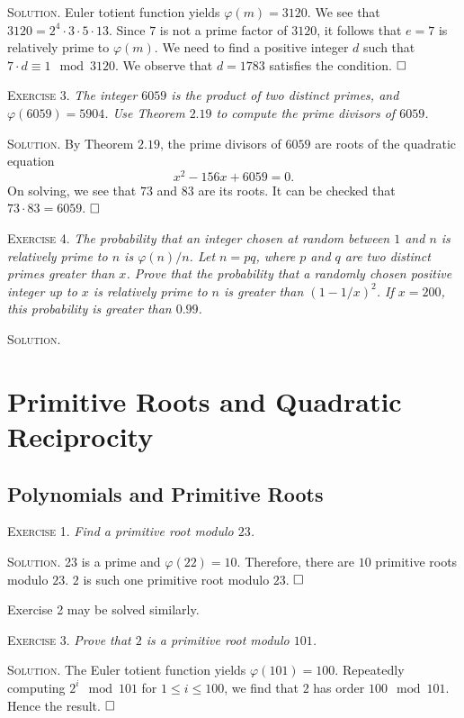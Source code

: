 \documentclass[11pt, leqno]{article}
\newcommand{\done}{\ensuremath{\hfill\square}}
\begin{document}
\textsc{Solution}. Euler totient function yields $\varphi(m) = 3120$. We see that $3120 = 2^4 \cdot 3 \cdot 5 \cdot 13$. Since $7$ is not a prime factor of $3120$, it follows that $e = 7$ is relatively prime to $\varphi(m)$. We need to find a positive integer $d$ such that $7\cdot d \equiv 1 \mod 3120$.
We observe that $d = 1783$ satisfies the condition. \done

\textsc{Exercise 3}. \emph{The integer $6059$ is the product of two distinct primes, and $\varphi(6059) = 5904$. Use Theorem $2.19$ to compute the prime divisors of $6059$.}

\textsc{Solution}. By Theorem $2.19$, the prime divisors of $6059$ are roots of the quadratic equation 
\begin{displaymath}
x^2 - 156x + 6059 = 0.
\end{displaymath}
On solving, we see that $73$ and $83$ are its roots. It can be checked that $73\cdot 83 = 6059$. \done

\textsc{Exercise 4}. \emph{The probability that an integer chosen at random between $1$ and $n$ is relatively prime to $n$ is $\varphi(n)/n$. Let $n=pq$, where $p$ and $q$ are two distinct primes greater than $x$. Prove that the probability that a randomly chosen positive integer up to $x$ is relatively prime to $n$ is greater than $(1-1/x)^{2}$. If $x=200$, this probability is greater than $0.99$.}

\textsc{Solution}. 

\section{Primitive Roots and Quadratic Reciprocity}

\subsection{Polynomials and Primitive Roots}

\textsc{Exercise 1}. \emph{Find a primitive root modulo $23$.}

\textsc{Solution}. 23 is a prime and $\varphi(22) = 10$. Therefore, there are $10$ primitive roots modulo $23$. $2$ is such one primitive root modulo $23$. \done

Exercise 2 may be solved similarly.

\textsc{Exercise 3}. \emph{Prove that $2$ is a primitive root modulo $101$.}

\textsc{Solution}. The Euler totient function yields $\varphi(101) = 100$. Repeatedly computing $2^i \mod 101$ for $1\leq i \leq 100$, we find that $2$ has order $100 \mod 101$. Hence the result. \done
\end{document}
